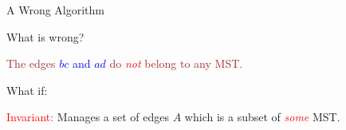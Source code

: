 \begin{frame}{A Wrong Algorithm}
  \begin{alertblock}{What is wrong?}

	\centerline{\textcolor{brown}{The edges \textcolor{blue}{$bc$ and $ad$} do \textcolor{red}{\it not} belong to any MST.}}
  \end{alertblock}

  \pause
  \vspace{0.50cm}

  \begin{alertblock}{What if:}
	\centerline{\textcolor{red}{Invariant:} Manages a set of edges $A$ which is a subset of \textcolor{red}{\it some} MST.}
  \end{alertblock}
\end{frame}
